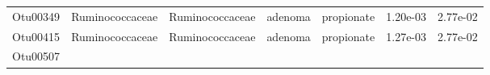 \documentclass[11pt,]{article}
\begin{document}
\begin{longtable}[]{@{}ccccccc@{}}
\begin{minipage}[t]{0.09\columnwidth}\centering\strut
Otu00349\strut
\end{minipage} & \begin{minipage}[t]{0.17\columnwidth}\centering\strut
Ruminococcaceae\strut
\end{minipage} & \begin{minipage}[t]{0.17\columnwidth}\centering\strut
Ruminococcaceae\strut
\end{minipage} & \begin{minipage}[t]{0.09\columnwidth}\centering\strut
adenoma\strut
\end{minipage} & \begin{minipage}[t]{0.11\columnwidth}\centering\strut
propionate\strut
\end{minipage} & \begin{minipage}[t]{0.09\columnwidth}\centering\strut
1.20e-03\strut
\end{minipage} & \begin{minipage}[t]{0.09\columnwidth}\centering\strut
2.77e-02\strut
\end{minipage}\tabularnewline
\begin{minipage}[t]{0.09\columnwidth}\centering\strut
Otu00415\strut
\end{minipage} & \begin{minipage}[t]{0.17\columnwidth}\centering\strut
Ruminococcaceae\strut
\end{minipage} & \begin{minipage}[t]{0.17\columnwidth}\centering\strut
Ruminococcaceae\strut
\end{minipage} & \begin{minipage}[t]{0.09\columnwidth}\centering\strut
adenoma\strut
\end{minipage} & \begin{minipage}[t]{0.11\columnwidth}\centering\strut
propionate\strut
\end{minipage} & \begin{minipage}[t]{0.09\columnwidth}\centering\strut
1.27e-03\strut
\end{minipage} & \begin{minipage}[t]{0.09\columnwidth}\centering\strut
2.77e-02\strut
\end{minipage}\tabularnewline
\begin{minipage}[t]{0.09\columnwidth}\centering\strut
Otu00507\strut
\end{minipage} & \begin{minipage}[t]{0.17\columnwidth}\centering\strut

\end{minipage}
\end{longtable}
\end{document}
